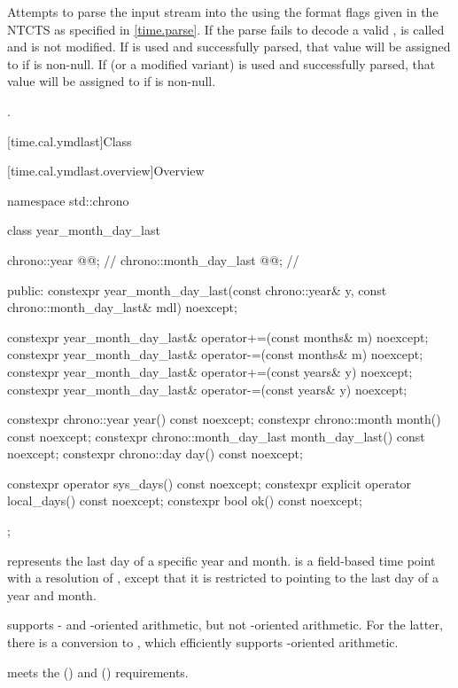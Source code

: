 \begin{itemdescr}
\pnum
\effects
Attempts to parse the input stream 
into the   using
the format flags given in the NTCTS 
as specified in \ref{time.parse}.
If the parse fails to decode a valid ,
 is called and
 is not modified.
If  is used and successfully parsed,
that value will be assigned to  if  is non-null.
If  (or a modified variant) is used and successfully parsed,
that value will be assigned to  if  is non-null.

\pnum
\returns
{}.
\end{itemdescr}

[time.cal.ymdlast]{Class }

[time.cal.ymdlast.overview]{Overview}

\begin{codeblock}
namespace std::chrono {
  class year_month_day_last {
    chrono::year           @@;          // \expos
    chrono::month_day_last @@;        // \expos

  public:
    constexpr year_month_day_last(const chrono::year& y,
                                  const chrono::month_day_last& mdl) noexcept;

    constexpr year_month_day_last& operator+=(const months& m) noexcept;
    constexpr year_month_day_last& operator-=(const months& m) noexcept;
    constexpr year_month_day_last& operator+=(const years& y)  noexcept;
    constexpr year_month_day_last& operator-=(const years& y)  noexcept;

    constexpr chrono::year           year()           const noexcept;
    constexpr chrono::month          month()          const noexcept;
    constexpr chrono::month_day_last month_day_last() const noexcept;
    constexpr chrono::day            day()            const noexcept;

    constexpr          operator sys_days()   const noexcept;
    constexpr explicit operator local_days() const noexcept;
    constexpr bool ok() const noexcept;
  };
}
\end{codeblock}

\pnum
{} represents the last day of a specific year and month.
 is a field-based time point with a resolution of ,
except that it is restricted to pointing to the last day of a year and month.
\begin{note}
 supports - and -oriented arithmetic,
but not -oriented arithmetic.
For the latter, there is a conversion to ,
which efficiently supports -oriented arithmetic.
\end{note}
 meets the  ()
and  () requirements.

